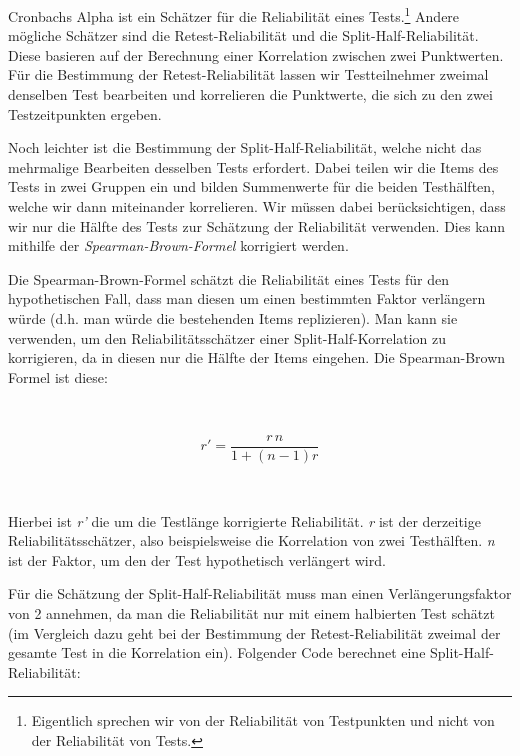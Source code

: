 \documentclass[12pt,]{tufte-book}
\theoremstyle{definition}
\theoremstyle{definition}
\theoremstyle{definition}
\theoremstyle{remark}
\begin{document}
Cronbachs Alpha ist ein Schätzer für die Reliabilität eines
Tests.\footnote{Eigentlich sprechen wir von der Reliabilität von
  Testpunkten und nicht von der Reliabilität von Tests.} Andere mögliche
Schätzer sind die Retest-Reliabilität und die Split-Half-Reliabilität.
Diese basieren auf der Berechnung einer Korrelation zwischen zwei
Punktwerten. Für die Bestimmung der Retest-Reliabilität lassen wir
Testteilnehmer zweimal denselben Test bearbeiten und korrelieren die
Punktwerte, die sich zu den zwei Testzeitpunkten ergeben.

Noch leichter ist die Bestimmung der Split-Half-Reliabilität, welche
nicht das mehrmalige Bearbeiten desselben Tests erfordert. Dabei teilen
wir die Items des Tests in zwei Gruppen ein und bilden Summenwerte für
die beiden Testhälften, welche wir dann miteinander korrelieren. Wir
müssen dabei berücksichtigen, dass wir nur die Hälfte des Tests zur
Schätzung der Reliabilität verwenden. Dies kann mithilfe der
\emph{Spearman-Brown-Formel} korrigiert werden.

Die Spearman-Brown-Formel schätzt die Reliabilität eines Tests für den
hypothetischen Fall, dass man diesen um einen bestimmten Faktor
verlängern würde (d.h. man würde die bestehenden Items replizieren). Man
kann sie verwenden, um den Reliabilitätsschätzer einer
Split-Half-Korrelation zu korrigieren, da in diesen nur die Hälfte der
Items eingehen. Die Spearman-Brown Formel ist diese:

~

\[r' = \frac{r \, n}{1 + (n - 1) r}\]

~

Hierbei ist \emph{r'} die um die Testlänge korrigierte Reliabilität.
\emph{r} ist der derzeitige Reliabilitätsschätzer, also beispielsweise
die Korrelation von zwei Testhälften. \emph{n} ist der Faktor, um den
der Test hypothetisch verlängert wird.

Für die Schätzung der Split-Half-Reliabilität muss man einen
Verlängerungsfaktor von 2 annehmen, da man die Reliabilität nur mit
einem halbierten Test schätzt (im Vergleich dazu geht bei der Bestimmung
der Retest-Reliabilität zweimal der gesamte Test in die Korrelation
ein). Folgender Code berechnet eine Split-Half-Reliabilität:
\end{document}
